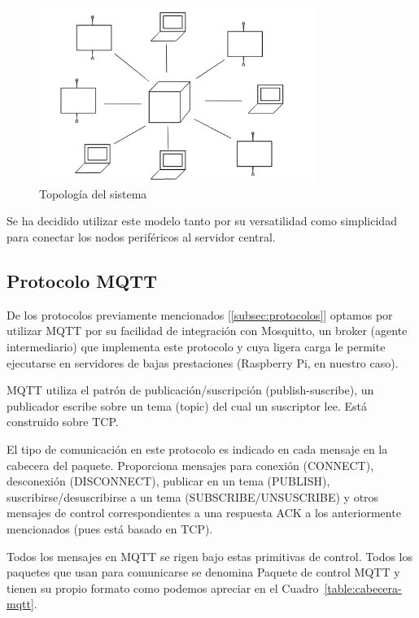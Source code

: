 \documentclass[a4paper,10pt]{article}
\begin{document}
\begin{figure}[H]
  \centering
  \includegraphics[width=0.8\textwidth]{img/esquema_estrella.png}
  \caption{Topología del sistema}\label{fig:esquema_estrella}
\end{figure}


Se ha decidido utilizar este modelo tanto por su versatilidad como
simplicidad para conectar los nodos periféricos al servidor central.

\newpage

\subsection{Protocolo MQTT}\label{protocolo-mqtt}

De los protocolos previamente mencionados [\ref{subsec:protocolos}]
optamos por utilizar MQTT por su facilidad de integración con
Mosquitto, un broker (agente intermediario) que implementa este
protocolo y cuya ligera carga le permite ejecutarse en servidores de
bajas prestaciones (Raspberry Pi, en nuestro caso).

MQTT utiliza el patrón de publicación/suscripción (publish-suscribe),
un publicador escribe sobre un tema (topic) del cual un suscriptor
lee. Está construido sobre TCP.

El tipo de comunicación en este protocolo es indicado en cada mensaje
en la cabecera del paquete. Proporciona mensajes para conexión
(CONNECT), desconexión (DISCONNECT), publicar en un tema (PUBLISH),
suscribirse/desuscribirse a un tema (SUBSCRIBE/UNSUSCRIBE) y otros
mensajes de control correspondientes a una respuesta ACK a los
anteriormente mencionados (pues está basado en
TCP).\cite{banksMQTTVersionEdited}

Todos los mensajes en MQTT se rigen bajo estas primitivas de
control. Todos los paquetes que usan para comunicarse se denomina
Paquete de control MQTT y tienen su propio formato como podemos
apreciar en el Cuadro~\ref{table:cabecera-mqtt}.
\end{document}
